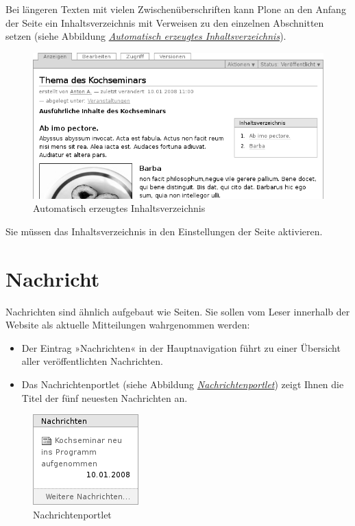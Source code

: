 \documentclass[a4paper,12pt,ngerman]{manual}
\begin{document}
Bei längeren Texten mit vielen Zwischenüberschriften kann Plone an den
Anfang der Seite ein Inhaltsverzeichnis mit Verweisen zu den einzelnen
Abschnitten setzen (siehe Abbildung \hyperlink{fig-seite-inhaltsverzeichnis}{\emph{Automatisch erzeugtes Inhaltsverzeichnis}}).
\hypertarget{fig-seite-inhaltsverzeichnis}{}\begin{figure}[htbp]
\centering

\includegraphics{seite-inhaltsverzeichnis.png}
\caption{Automatisch erzeugtes Inhaltsverzeichnis}\end{figure}

Sie müssen das Inhaltsverzeichnis in den Einstellungen der Seite aktivieren.

\resetcurrentobjects
\hypertarget{--doc-inhaltstypen/nachricht}{}

\hypertarget{sec-nachricht}{}\section{Nachricht}

Nachrichten sind ähnlich aufgebaut wie Seiten. Sie sollen vom Leser innerhalb
der Website als aktuelle Mitteilungen wahrgenommen werden:
\begin{itemize}
\item {} 
Der Eintrag »Nachrichten« in der Hauptnavigation führt zu einer
Übersicht aller veröffentlichten Nachrichten.

\item {} 
Das Nachrichtenportlet (siehe Abbildung \hyperlink{fig-portlet-news}{\emph{Nachrichtenportlet}})
zeigt Ihnen die Titel der fünf neuesten Nachrichten an.

\end{itemize}
\hypertarget{fig-portlet-news}{}\begin{figure}[htbp]
\centering

\includegraphics{portlet-news.png}
\caption{Nachrichtenportlet}\end{figure}
\end{document}
